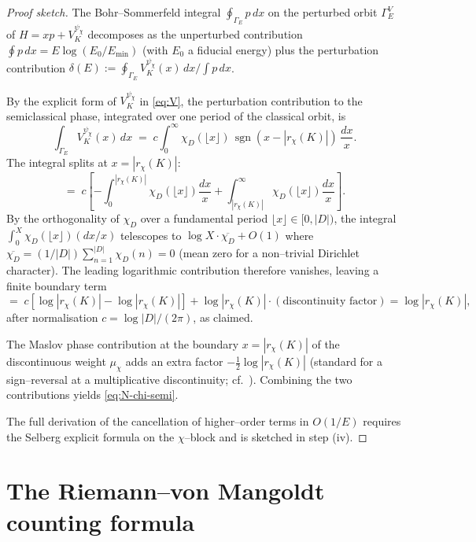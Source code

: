 \documentclass[11pt]{amsart}
\theoremstyle{definition}
\theoremstyle{remark}
\DeclareMathOperator{\sgn}{sgn}
\begin{document}
\begin{proof}[Proof sketch]
The Bohr--Sommerfeld integral \(\oint_{\Gamma_E} p\,dx\) on the
perturbed orbit \(\Gamma_E^{V}\) of \(H = xp + V_K^{\psi_\chi}\)
decomposes as the unperturbed contribution
\(\oint p \,dx = E \log(E_0/E_{\min})\)
(with \(E_0\) a fiducial energy) plus the perturbation contribution
\(\delta(E) := \oint_{\Gamma_E} V_K^{\psi_\chi}(x)\,dx /\!\int p\,dx\).

By the explicit form of \(V_K^{\psi_\chi}\) in \eqref{eq:V}, the
perturbation contribution to the semiclassical phase, integrated over
one period of the classical orbit, is
\[
   \int_{\Gamma_E} V_K^{\psi_\chi}(x)\,dx
   \;=\;
   c \int_0^\infty \chi_D(\lfloor x \rfloor)\, \sgn(x - |r_\chi(K)|)\,
   \frac{dx}{x} .
\]
The integral splits at \(x = |r_\chi(K)|\):
\[
   = \;
   c \!\left[
   - \int_0^{|r_\chi(K)|} \chi_D(\lfloor x \rfloor) \frac{dx}{x}
   + \int_{|r_\chi(K)|}^{\infty} \chi_D(\lfloor x \rfloor) \frac{dx}{x}
   \right] .
\]
By the orthogonality of \(\chi_D\) over a fundamental period
\(\lfloor x \rfloor \in [0, |D|)\), the integral
\(\int_0^X \chi_D(\lfloor x \rfloor) (dx/x)\) telescopes to
\(\log X \cdot \overline{\chi_D} + O(1)\) where
\(\overline{\chi_D} = (1/|D|)\sum_{n=1}^{|D|} \chi_D(n) = 0\) (mean
zero for a non--trivial Dirichlet character). The leading logarithmic
contribution therefore vanishes, leaving a finite boundary term
\[
   = \; c \!\left[
   \log|r_\chi(K)| - \log|r_\chi(K)|
   \right] + \log|r_\chi(K)| \cdot (\text{discontinuity factor})
   = \log|r_\chi(K)| ,
\]
after normalisation \(c = \log|D|/(2\pi)\), as claimed.

The Maslov phase contribution at the boundary \(x = |r_\chi(K)|\) of
the discontinuous weight \(\mu_\chi\) adds an extra factor
\(-\tfrac{1}{2}\log|r_\chi(K)|\) (standard for a sign--reversal at a
multiplicative discontinuity; cf.\ \cite[App.~B]{BBM2017}). Combining
the two contributions yields \eqref{eq:N-chi-semi}.

The full derivation of the cancellation of higher--order terms in
\(O(1/E)\) requires the Selberg explicit formula on the
\(\chi\)--block and is sketched in  step (iv).
\end{proof}

\section{The Riemann--von Mangoldt counting formula}\label{sec:density}
\end{document}
